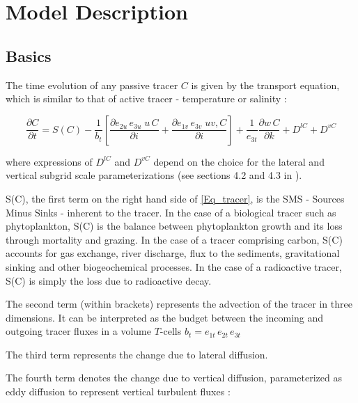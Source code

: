\documentclass[../main/TOP_manual]{subfiles}
\begin{document}
\newcommand{\cd}{\mathrm{CO_2}}
\newcommand{\Ct}{\mathrm{C_T}}
\newcommand{\pacd}{\mathrm{p^a_{CO_2}}}
\newcommand{\cq}{\mathrm{^{14}C}}
\newcommand{\Dcq}{\Delta ^{14}\mathrm{C}}
\newcommand{\Rq}{\mathrm{^{14}{R}}}

\chapter{Model Description}
\label{chap:ModDes}

\section{Basics}
\label{sec:Bas}

The time evolution of any passive tracer $C$ is given by the transport equation, which is similar to that of active tracer - temperature or salinity :

\begin{equation}
\frac{\partial C}{\partial t} = {S(C)} -  \frac{1}{b_t} \left[   \frac{\partial e_{2u}\,e_{3u} \;  u\, C}{\partial i} +   \frac{\partial e_{1v}\,e_{3v} \;  uv, C}{\partial i}  \right] + \frac{1}{e_{3t}} \frac{\partial w\, C}{\partial k} + D^{lC} + D^{vC}
\label{Eq_tracer}
\end{equation}

where expressions of $D^{lC}$ and $D^{vC}$ depend on the choice for the lateral and vertical subgrid scale parameterizations (see sections 4.2 and 4.3 in \cite{nemo_manual}).

{S(C)}, the first term on the right hand side of \autoref{Eq_tracer}, is the SMS - Sources Minus Sinks - inherent to the tracer.
In the case of a biological tracer such as phytoplankton, {S(C)} is the balance between phytoplankton growth and its loss through mortality and grazing.
In the case of a tracer comprising carbon,  {S(C)} accounts for gas exchange, river discharge, flux to the sediments, gravitational sinking and other biogeochemical processes.
In the case of a radioactive tracer, {S(C)} is simply the loss due to radioactive decay.

The second term (within brackets) represents the advection of the tracer in three dimensions.
It can be interpreted as the budget between the incoming and outgoing tracer fluxes in a volume $T$-cells $b_t= e_{1t}\,e_{2t}\,e_{3t}$

The third term represents the change due to lateral diffusion.

The fourth term denotes the change due to vertical diffusion, parameterized as eddy diffusion to represent vertical turbulent fluxes :
\end{document}
